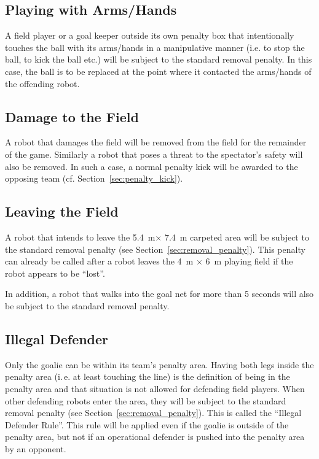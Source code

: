 \documentclass[12pt]{article}
\newcommand{\ie}{\mbox{i.\,e.}\xspace}
\newcommand{\cf}{\mbox{cf.}\xspace}
\newcommand{\TotalWidth}{5.4~m\xspace}
\newcommand{\TotalLength}{7.4~m\xspace }
\begin{document}
\subsection{Playing with Arms/Hands}
\label{sec:hand_ball}

A field player or a goal keeper outside its own penalty box that intentionally touches the ball with its arms/hands in a manipulative manner (i.e. to stop the ball, to kick the ball etc.) will be subject to the standard removal penalty. In this case, the ball is to be replaced at the point where it contacted the arms/hands of the offending robot.

\subsection{Damage to the Field}

A robot that damages the field will be removed from the field for the remainder of the game. Similarly a robot that poses a threat to the spectator's safety will also be removed. In such a case, a normal penalty kick will be awarded to the opposing team (\cf Section~\ref{sec:penalty_kick}).

\subsection{Leaving the Field}
\label{sec:leaving_field}

A robot that intends to leave the \TotalWidth $\times$ \TotalLength carpeted area will be subject to the standard removal penalty (see
Section~\ref{sec:removal_penalty}). This penalty can already be called after a robot leaves the 4~m $\times$ 6~m playing field if the robot appears to be ``lost''.

In addition, a robot that walks into the goal net for more than 5 seconds will also be subject to the standard removal penalty.

\subsection{Illegal Defender}

Only the goalie can be within its team's penalty area. Having both legs inside the penalty area (\ie at least touching the line) is the definition of being in the penalty area and that situation is not allowed for defending field players. When other defending robots enter the area, they will be subject to the standard removal penalty (see Section~\ref{sec:removal_penalty}). This is called the ``Illegal Defender Rule''. This rule will be applied even if the goalie is outside of the penalty area, but not if an operational defender is pushed into the penalty area by an opponent.
\end{document}
